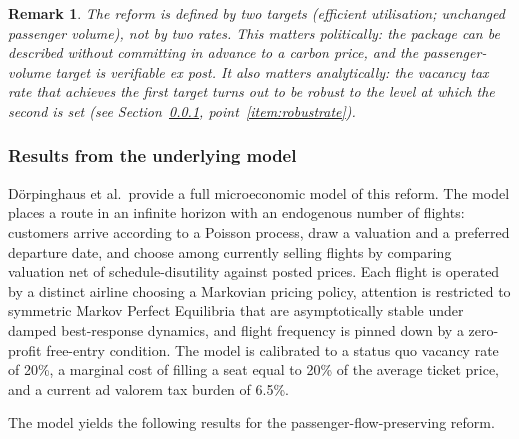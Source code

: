 \documentclass[11pt]{article}
\newtheorem{remark}{Remark}
\begin{document}
\begin{remark}
The reform is defined by two \emph{targets} (efficient utilisation; unchanged
passenger volume), not by two rates. This matters politically: the package can
be described without committing in advance to a carbon price, and the
passenger-volume target is verifiable ex post. It also matters analytically: the
vacancy tax rate that achieves the first target turns out to be robust to the
level at which the second is set (see Section~\ref{subsec:results},
point~\ref{item:robustrate}).
\end{remark}

\subsubsection{Results from the underlying model}
\label{subsec:results}

Dörpinghaus et al.\ provide a full microeconomic model of this reform. The model
places a route in an infinite horizon with an endogenous number of flights:
customers arrive according to a Poisson process, draw a valuation and a
preferred departure date, and choose among currently selling flights by
comparing valuation net of schedule-disutility against posted prices. Each
flight is operated by a distinct airline choosing a Markovian pricing policy,
attention is restricted to symmetric Markov Perfect Equilibria that are
asymptotically stable under damped best-response dynamics, and flight frequency
is pinned down by a zero-profit free-entry condition. The model is calibrated to
a status quo vacancy rate of 20\%, a marginal cost of filling a seat equal to
20\% of the average ticket price, and a current ad valorem tax burden of
6.5\%.

The model yields the following results for the passenger-flow-preserving reform.
\end{document}
